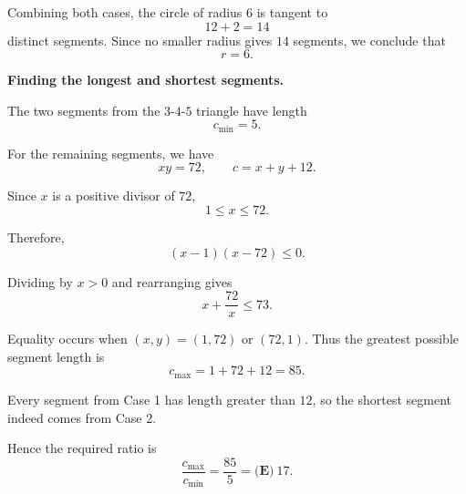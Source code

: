 \begin{enumerate}
 Combining both cases, the circle of radius $6$ is tangent to
 \[12+2=14\]distinct segments. Since no smaller radius gives $14$ segments, we conclude that
 \[\boxed{r=6}.\]

 \textbf{Finding the longest and shortest segments.}

 The two segments from the $3$-$4$-$5$ triangle have length
 \[c_{\min}=5.\]

 For the remaining segments, we have
 \[xy=72,\qquad c=x+y+12.\]

 Since $x$ is a positive divisor of $72$,
 \[1\le x\le72.\]

 Therefore,
 \[(x-1)(x-72)\le0.\]

 Dividing by $x>0$ and rearranging gives
 \[x+\frac{72}{x}\le73.\]

 Equality occurs when $(x,y)=(1,72)$ or $(72,1)$. Thus the greatest possible segment length is
 \[c_{\max}=1+72+12=85.\]

 Every segment from Case 1 has length greater than $12$, so the shortest segment indeed comes from Case 2.

 Hence the required ratio is
 \[\frac{c_{\max}}{c_{\min}}=\frac{85}{5} =\boxed{\textbf{(E)}\ 17}.\]



\end{enumerate}